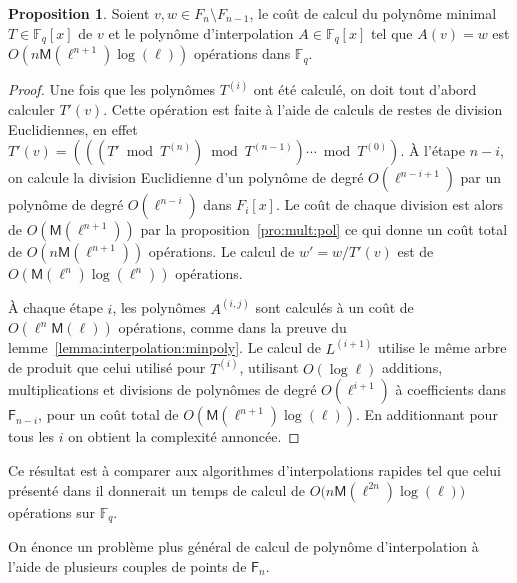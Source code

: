 \documentclass[10pt,a4paper]{book}
\theoremstyle{plain}
\theoremstyle{definition}
\theoremstyle{definition}
\theoremstyle{definition}
\theoremstyle{definition}
\newtheorem{prop}[thm]{Proposition}
\theoremstyle{definition}
\theoremstyle{remark}
\theoremstyle{remark}
\theoremstyle{definition}
\begin{document}
\begin{prop}
  Soient $v,w\in F_n\setminus F_{n-1}$, le coût de calcul du polynôme minimal
  $T\in \mathbb{F}_q[x]$ de $v$ et le polynôme d'interpolation $A\in 
  \mathbb{F}_q[x]$ tel que $A(v)=w$ est $O(n\mathsf{M}(\ell^{n+1})\log(\ell))$
  opérations dans $\mathbb{F}_q$.
\end{prop}
\begin{proof}
  Une fois que les polynômes $T^{(i)}$ ont été calculé, on doit tout d'abord 
  calculer $T'(v)$. Cette opération est faite à l'aide de calculs de restes de 
  division Euclidiennes, en effet
  $T'(v) = (((T' \bmod T^{(n)}) \bmod T^{(n-1)}) \cdots \bmod T^{(0)})$.
  \`A l'étape $n-i$, on calcule la division Euclidienne d'un polynôme de degré
   $O(\ell^{n-i+1})$ par un polynôme de degré $O(\ell^{n-i})$ dans  $F_i[x]$. 
   Le coût de chaque division est alors de $O(\mathsf{M}(\ell^{n+1}))$ 
   par la proposition~\ref{pro:mult:pol} 
   ce qui donne un coût total de $O(n\mathsf{M}(\ell^{n+1}))$ opérations.
   Le calcul de $w'=w/T'(v)$ est de $O(\mathsf{M}(\ell^n)\log(\ell^n))$ opérations.

  \`A chaque étape $i$, les polynômes $A^{(i,j)}$ sont calculés à un coût de
  $O(\ell^n\mathsf{M}(\ell))$ opérations, comme dans la preuve du  
  lemme~\ref{lemma:interpolation:minpoly}.  Le calcul de $L^{(i+1)}$ utilise 
  le même arbre de produit que celui utilisé pour $T^{(i)}$, 
  utilisant $O(\log \ell)$ additions, multiplications et divisions de polynômes
  de degré $O(\ell^{i+1})$ à coefficients dans $\mathsf{F}_{n-i}$, pour un coût
   total de $O(\mathsf{M}(\ell^{n+1})\log(\ell))$. En additionnant pour tous les
  $i$ on obtient la complexité annoncée.
\end{proof}

Ce résultat est à comparer aux algorithmes d'interpolations rapides 
 tel que  celui présenté dans \cite[Chapter~10.2]{vzGJG03} il donnerait un temps
 de calcul de  $O\bigl(n\mathsf{M}(\ell^{2n})\log(\ell)\bigr)$ opérations sur 
 $\mathbb{F}_q$. 

On énonce un problème plus général de calcul de polynôme d'interpolation 
à l'aide de plusieurs couples de points de $\mathsf{F}_n$.
\end{document}
